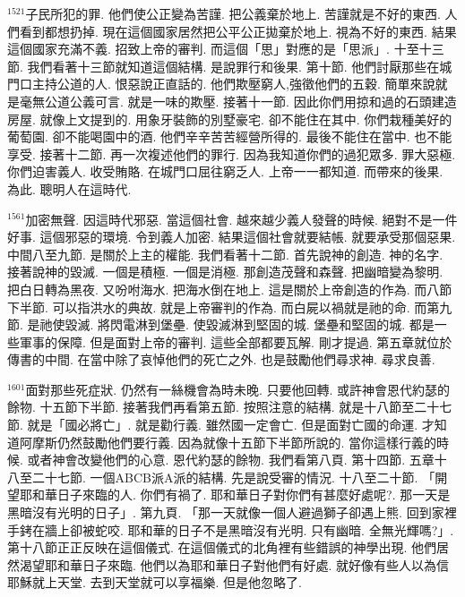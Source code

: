 \documentclass{book}
\begin{document}
$^{1521}$子民所犯的罪.
他們使公正變為苦謹.
把公義棄於地上.
苦謹就是不好的東西.
人們看到都想扔掉.
現在這個國家居然把公平公正拋棄於地上.
視為不好的東西.
結果這個國家充滿不義.
招致上帝的審判.
而這個「思」對應的是「思派」.
十至十三節.
我們看著十三節就知道這個結構.
是說罪行和後果.
第十節.
他們討厭那些在城門口主持公道的人.
恨惡說正直話的.
他們欺壓窮人,強徵他們的五穀.
簡單來說就是毫無公道公義可言.
就是一味的欺壓.
接著十一節.
因此你們用掠和過的石頭建造房屋.
就像上文提到的.
用象牙裝飾的別墅豪宅.
卻不能住在其中.
你們栽種美好的葡萄園.
卻不能喝園中的酒.
他們辛辛苦苦經營所得的.
最後不能住在當中.
也不能享受.
接著十二節.
再一次複述他們的罪行.
因為我知道你們的過犯眾多.
罪大惡極.
你們迫害義人.
收受賄賂.
在城門口屈往窮乏人.
上帝一一都知道.
而帶來的後果.
為此.
聰明人在這時代.

$^{1561}$加密無聲.
因這時代邪惡.
當這個社會.
越來越少義人發聲的時候.
絕對不是一件好事.
這個邪惡的環境.
令到義人加密.
結果這個社會就要結帳.
就要承受那個惡果.
中間八至九節.
是關於上主的權能.
我們看著十二節.
首先說神的創造.
神的名字.
接著說神的毀滅.
一個是積極.
一個是消極.
那創造茂聲和森聲.
把幽暗變為黎明.
把白日轉為黑夜.
又吩咐海水.
把海水倒在地上.
這是關於上帝創造的作為.
而八節下半節.
可以指洪水的典故.
就是上帝審判的作為.
而白屍以禍就是祂的命.
而第九節.
是祂使毀滅.
將閃電淋到堡壘.
使毀滅淋到堅固的城.
堡壘和堅固的城.
都是一些軍事的保障.
但是面對上帝的審判.
這些全部都要瓦解.
剛才提過.
第五章就位於傳書的中間.
在當中除了哀悼他們的死亡之外.
也是鼓勵他們尋求神.
尋求良善.

$^{1601}$面對那些死症狀.
仍然有一絲機會為時未晚.
只要他回轉.
或許神會恩代約瑟的餘物.
十五節下半節.
接著我們再看第五節.
按照注意的結構.
就是十八節至二十七節.
就是「國必將亡」.
就是勸行義.
雖然國一定會亡.
但是面對亡國的命運.
才知道阿摩斯仍然鼓勵他們要行義.
因為就像十五節下半節所說的.
當你這樣行義的時候.
或者神會改變他們的心意.
恩代約瑟的餘物.
我們看第八頁.
第十四節.
五章十八至二十七節.
一個ABCB派A派的結構.
先是說受審的情況.
十八至二十節.
「開望耶和華日子來臨的人.
你們有禍了.
耶和華日子對你們有甚麼好處呢?.
那一天是黑暗沒有光明的日子」.
第九頁.
「那一天就像一個人避過獅子卻遇上熊.
回到家裡手銬在牆上卻被蛇咬.
耶和華的日子不是黑暗沒有光明.
只有幽暗.
全無光輝嗎?」.
第十八節正正反映在這個儀式.
在這個儀式的北角裡有些錯誤的神學出現.
他們居然渴望耶和華日子來臨.
他們以為耶和華日子對他們有好處.
就好像有些人以為信耶穌就上天堂.
去到天堂就可以享福樂.
但是他忽略了.
\end{document}

